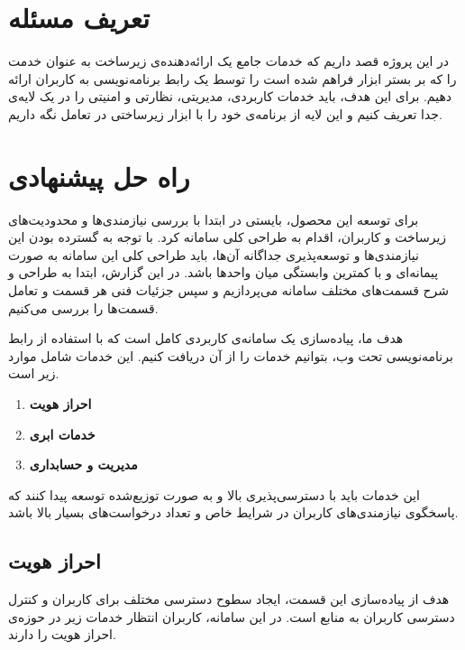 \section{تعریف مسئله}
در این پروژه قصد داریم که خدمات جامع یک ارائه‌دهنده‌ی زیرساخت به عنوان خدمت را که بر بستر ابزار  فراهم شده است را توسط یک رابط برنامه‌نویسی به کاربران ارائه دهیم. برای این هدف، باید خدمات کاربردی، مدیریتی، نظارتی و امنیتی را در یک لایه‌ی جدا تعریف کنیم و این لایه از برنامه‌ی خود را با ابزار زیرساختی در تعامل نگه داریم. 
\section{راه حل پیشنهادی}
برای توسعه این محصول، بایستی در ابتدا با بررسی نیازمندی‌ها و محدودیت‌های زیرساخت و کاربران، اقدام به طراحی کلی سامانه کرد. با توجه به گسترده بودن این نیازمندی‌ها و توسعه‌پذیری جداگانه آن‌ها، باید طراحی کلی این سامانه به صورت پیمانه‌ای و با کمترین وابستگی میان واحد‌ها باشد. در این گزارش، ابتدا به طراحی و شرح قسمت‌های مختلف سامانه می‌پردازیم و سپس جزئیات فنی هر قسمت و تعامل قسمت‌ها را بررسی می‌کنیم.


هدف ما، پیاده‌سازی یک سامانه‌ی کاربردی کامل است که با استفاده از رابط برنامه‌نویسی تحت وب، بتوانیم خدمات را از آن دریافت کنیم. این خدمات شامل موارد زیر است.

\begin{enumerate}
	\item \textbf{احراز هویت}
	
	\item \textbf{خدمات ابری}
	
	\item \textbf{مدیریت و حسابداری}
\end{enumerate}

این خدمات باید با دسترسی‌پذیری بالا و به صورت توزیع‌شده توسعه پیدا کنند که پاسخگوی نیازمندی‌های کاربران در شرایط خاص و تعداد درخواست‌های بسیار بالا باشد.

\subsection{احراز هویت}
هدف از پیاده‌سازی این قسمت، ایجاد سطوح دسترسی مختلف برای کاربران و کنترل دسترسی کاربران به منابع است. در این سامانه، کاربران انتظار خدمات زیر در حوزه‌ی احراز هویت را دارند.

